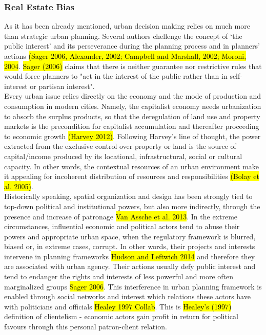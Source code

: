 \documentclass[11pt]{report}
\begin{document}
\subsubsection{Real Estate Bias}

As it has been already mentioned, urban decision making relies on much more than strategic urban planning.
Several authors chellenge the concept of ‘the public interest’ and its perseverance during the planning process and in planners' actions \hl{(Sager 2006, Alexander, 2002; Campbell and Marshall, 2002; Moroni, 2004}. \hl{Sager (2006)} claims that there is neither guarantee nor restrictive rules that would force planners to "act in the interest of the public rather than in self-interest or partisan interest".
\\
Every urban issue relies directly on the economy  and  the  mode  of  production  and  consumption  in  modern  cities.  Namely,  the  capitalist  economy  needs urbanization to absorb the surplus products, so that the deregulation of land use and property markets is the precondition for capitalist accumulation and thereafter proceeding to economic growth \hl{(Harvey 2012)}. Following Harvey’s line of thought, the power  extracted  from  the  exclusive  control  over  property  or  land  is  the  source  of  capital/income  produced  by  its  locational, infrastructural, social or cultural capacity. In other words, the contextual resources of an urban environment make it appealing for incoherent distribution of resources and responsibilities \hl{(Bolay et al. 2005)}.
\\
Historically speaking, spatial organization and design has been strongly tied to top-down political and institutional powers, but also more indirectly, through the presence and increase of patronage
\hl{Van Assche et al. 2013}.
In the extreme circumstances, influential economic and political actors tend to abuse their powers and appropriate urban space, when the regulatory framework is blurred, biased or, in extreme cases, corrupt. In other words, their projects and interests intervene in planning frameworks \hl{Hudson and Leftwich 2014} and therefore they are associated with urban agency.
Their actions usually defy public interest and tend to endanger the rights and interests of less powerful and more often marginalized groups \hl{Sager 2006}.
This interference in urban planning framework is enabled through social networks and interest which relations these actors have with politicians and officials \hl{Healey 1997 Collab}. This is \hl{Healey's (1997)} definition of clientelism - economic actors gain profit in return for political favours through this personal patron-client relation.
\end{document}
